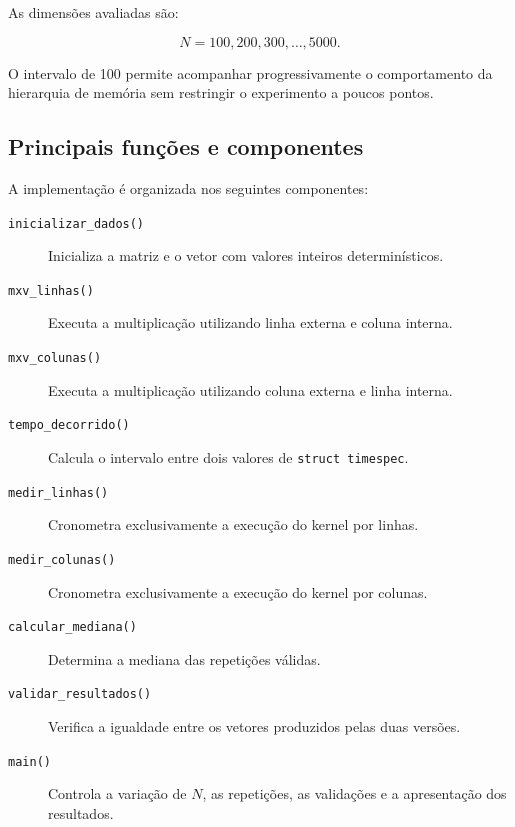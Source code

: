 As dimensões avaliadas são:

\begin{equation}
    N =
    100,200,300,\ldots,5000.
\end{equation}

O intervalo de 100 permite acompanhar progressivamente o comportamento da
hierarquia de memória sem restringir o experimento a poucos pontos.


\subsection{Principais funções e componentes}

A implementação é organizada nos seguintes componentes:

\begin{description}

    \item[\texttt{inicializar\_dados()}]
    Inicializa a matriz e o vetor com valores inteiros determinísticos.

    \item[\texttt{mxv\_linhas()}]
    Executa a multiplicação utilizando linha externa e coluna interna.

    \item[\texttt{mxv\_colunas()}]
    Executa a multiplicação utilizando coluna externa e linha interna.

    \item[\texttt{tempo\_decorrido()}]
    Calcula o intervalo entre dois valores de
    \texttt{struct timespec}.

    \item[\texttt{medir\_linhas()}]
    Cronometra exclusivamente a execução do kernel por linhas.

    \item[\texttt{medir\_colunas()}]
    Cronometra exclusivamente a execução do kernel por colunas.

    \item[\texttt{calcular\_mediana()}]
    Determina a mediana das repetições válidas.

    \item[\texttt{validar\_resultados()}]
    Verifica a igualdade entre os vetores produzidos pelas duas versões.

    \item[\texttt{main()}]
    Controla a variação de \(N\), as repetições, as validações e a
    apresentação dos resultados.

\end{description}


